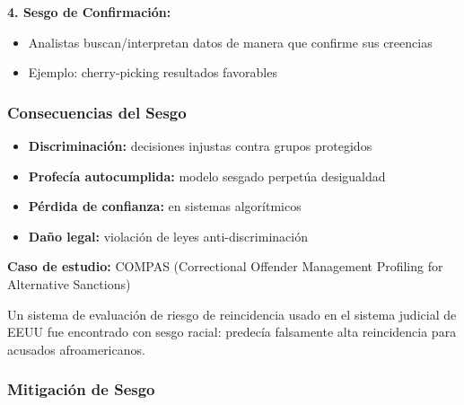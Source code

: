 \documentclass[11pt,a4paper]{article}
\begin{document}
\textbf{4. Sesgo de Confirmación:}
\begin{itemize}
\item Analistas buscan/interpretan datos de manera que confirme sus creencias
\item Ejemplo: cherry-picking resultados favorables
\end{itemize}

\subsubsection{Consecuencias del Sesgo}

\begin{itemize}
\item \textbf{Discriminación:} decisiones injustas contra grupos protegidos
\item \textbf{Profecía autocumplida:} modelo sesgado perpetúa desigualdad
\item \textbf{Pérdida de confianza:} en sistemas algorítmicos
\item \textbf{Daño legal:} violación de leyes anti-discriminación
\end{itemize}

\textbf{Caso de estudio:} COMPAS (Correctional Offender Management Profiling for Alternative Sanctions)

Un sistema de evaluación de riesgo de reincidencia usado en el sistema judicial de EEUU fue encontrado con sesgo racial: predecía falsamente alta reincidencia para acusados afroamericanos.

\subsubsection{Mitigación de Sesgo}
\end{document}
